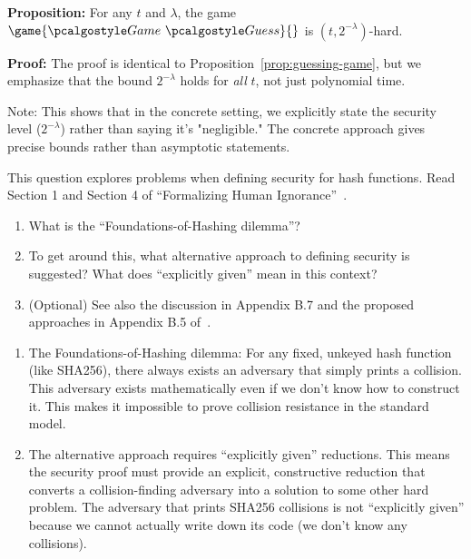\ifsolutions
\begin{mysolution}
  \textbf{Proposition:} For any $t$ and $\lambda$, the game $\game{\Game~\algo{Guess}}{}$ is $(t, 2^{-\lambda})$-hard.
  
  \textbf{Proof:} The proof is identical to Proposition~\ref{prop:guessing-game}, but we emphasize that the bound $2^{-\lambda}$ holds for \emph{all} $t$, not just polynomial time.
  
  Note: This shows that in the concrete setting, we explicitly state the security level ($2^{-\lambda}$) rather than saying it's "negligible."
  The concrete approach gives precise bounds rather than asymptotic statements.
\end{mysolution}
\fi

\begin{exercise}[Optional]\label{ex:foundations-hashing}
  This question explores problems when defining security for hash functions.
  Read Section 1 and Section 4 of ``Formalizing Human Ignorance''~\cite{VIETCRYPT:Rogaway06}.
  \begin{enumerate}
    \item What is the ``Foundations-of-Hashing dilemma''?
    \item To get around this, what alternative approach to defining security is suggested?
    What does ``explicitly given'' mean in this context?
    \item (Optional) See also the discussion in Appendix B.7 and the proposed approaches in Appendix B.5 of~\cite{AC:BerLan13}.
  \end{enumerate}
\end{exercise}

\ifsolutions
\begin{mysolution}
  \begin{enumerate}
    \item The Foundations-of-Hashing dilemma: For any fixed, unkeyed hash function (like SHA256), there always exists an adversary that simply prints a collision.
    This adversary exists mathematically even if we don't know how to construct it.
    This makes it impossible to prove collision resistance in the standard model.
    \item The alternative approach requires ``explicitly given'' reductions.
    This means the security proof must provide an explicit, constructive reduction that converts a collision-finding adversary into a solution to some other hard problem.
    The adversary that prints SHA256 collisions is not ``explicitly given'' because we cannot actually write down its code (we don't know any collisions).
  \end{enumerate}
\end{mysolution}
\fi

